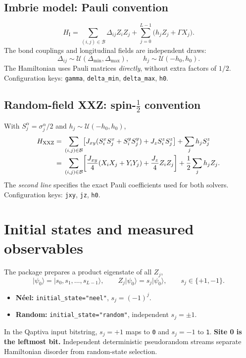 \documentclass[10pt,a4paper]{article}
\newcommand{\ket}[1]{\lvert #1 \rangle}
\newcommand{\Udist}{\mathcal U}
\newcommand{\Bonds}{\mathcal B}
\begin{document}
\subsection{Imbrie model: Pauli convention}
\begin{equation}
\boxed{H_{\mathrm I}=\sum_{(i,j)\in\Bonds}\Delta_{ij}Z_iZ_j
+\sum_{j=0}^{L-1}\big(h_jZ_j+\Gamma X_j\big).}
\end{equation}
The bond couplings and longitudinal fields are independent draws:
\begin{equation}
\Delta_{ij}\sim\Udist(\Delta_{\min},\Delta_{\max}),\qquad
h_j\sim\Udist(-h_0,h_0).
\end{equation}
The Hamiltonian uses Pauli matrices \emph{directly}, without extra factors of $1/2$. Configuration keys: \texttt{gamma}, \texttt{delta\_min}, \texttt{delta\_max}, \texttt{h0}.

\subsection{Random-field XXZ: spin-\texorpdfstring{$\tfrac12$}{1/2} convention}
With $S_j^\alpha=\sigma_j^\alpha/2$ and $h_j\sim\Udist(-h_0,h_0)$,
\begin{align}
H_{\mathrm{XXZ}}={}&\sum_{(i,j)\in\Bonds}\!\big[J_{xy}(S_i^x S_j^x+S_i^y S_j^y)+J_z S_i^zS_j^z\big]
+\sum_jh_jS_j^z \\[-2pt]
={}&\sum_{(i,j)\in\Bonds}\!\left[\frac{J_{xy}}{4}(X_iX_j+Y_iY_j)
+\frac{J_z}{4}Z_iZ_j\right]+\frac12\sum_jh_jZ_j.\notag
\end{align}
The \emph{second line} specifies the exact Pauli coefficients used for both solvers. Configuration keys: \texttt{jxy}, \texttt{jz}, \texttt{h0}.

\clearpage
\section{Initial states and measured observables}
The package prepares a product eigenstate of all $Z_j$,
\begin{equation}
\ket{\psi_0}=\ket{s_0,s_1,\ldots,s_{L-1}},\qquad
Z_j\ket{\psi_0}=s_j\ket{\psi_0},\qquad s_j\in\{+1,-1\}.
\end{equation}
\begin{itemize}
\item \textbf{N\'eel:} \texttt{initial\_state="neel"}, $s_j=(-1)^j$.
\item \textbf{Random:} \texttt{initial\_state="random"}, independent $s_j=\pm1$.
\end{itemize}
In the Qaptiva input bitstring, $s_j=+1$ maps to \texttt{0} and $s_j=-1$ to \texttt{1}. \textbf{Site 0 is the leftmost bit.} Independent deterministic pseudorandom streams separate Hamiltonian disorder from random-state selection.
\end{document}
